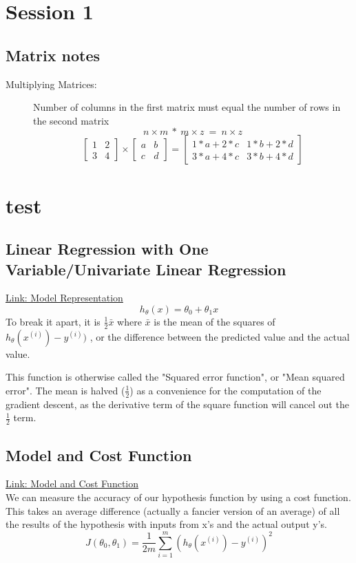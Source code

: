 \documentclass[a4paper]{report}
\begin{document}
\tableofcontents
\chapter{Session 1}
\section{Matrix notes}
\label{sec:matrix_notes}
\begin{description}
  \item[Multiplying Matrices:]
  Number of columns in the first matrix must equal the number of rows in the second matrix \\
$$ n\times m\ *\ m\times z\ =\ n\times z $$
  \[
\begin{bmatrix}
    1       & 2 \\
    3       & 4
\end{bmatrix}
\times
\begin{bmatrix}
    a       & b \\
    c       & d
\end{bmatrix}
  =
\begin{bmatrix}
    1*a+2*c       & 1*b+2*d \\
    3*a+4*c       & 3*b+4*d
\end{bmatrix}
\]
\end{description}
\chapter{test}
\section{Linear Regression with One Variable/Univariate Linear Regression}
\label{sec:linear_regression_one_variable}
\href{https://www.coursera.org/learn/machine-learning/lecture/db3jS/model-representation}{Link: Model Representation}
$$h_\theta(x)=\theta_0+\theta_1x$$
To break it apart, it is $\frac{1}{2} \bar{x}$ where $\bar{x}$ is the mean of the squares of $h_\theta(x^{(i)})-y^{(i)})$ , or the difference between the predicted value and the actual value.

This function is otherwise called the "Squared error function", or "Mean squared error". The mean is halved ($\frac{1}{2}$) as a convenience for the computation of the gradient descent, as the derivative term of the square function will cancel out the $\frac{1}{2}$ term.

\section{Model and Cost Function}
\label{sec:model_cost_function}
\href{https://www.coursera.org/learn/machine-learning/supplement/nhzyF/cost-function}{Link: Model and Cost Function} \\
We can measure the accuracy of our hypothesis function by using a cost function. This takes an average difference (actually a fancier version of an average) of all the results of the hypothesis with inputs from x's and the actual output y's.
$$J(\theta_0,\theta_1)=\dfrac{1}{2m}\sum_{i=1}^m(h_\theta(x^{(i)})-y^{(i)})^2$$
\end{document}
